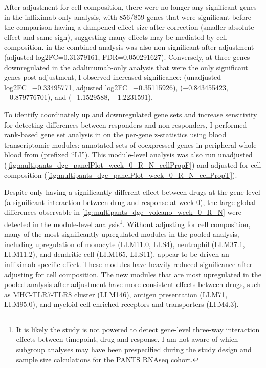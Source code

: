 After adjustment for cell composition, there were no longer any significant genes in the infliximab-only analysis, 
with 856/859 genes that were significant before the comparison having a dampened effect size after correction (smaller absolute effect and same sign), suggesting many effects may be mediated by cell composition.
 in the combined analysis was also non-significant after adjustment (adjusted log2FC=\num{0.31379161}, FDR=\num{0.050291627}).
Conversely, at three genes downregulated in the adalimumab-only analysis that were the only significant genes post-adjustment, I observed increased significance:
 (unadjusted log2FC=\num{-0.33495771}, adjusted log2FC=\num{-0.35115926}), 
 (\num{-0.843455423}, \num{-0.879776701}), 
and  (\num{-1.1529588}, \num{-1.2231591}).

To identify coordinately up and downregulated gene sets and increase sensitivity for detecting differences between responders and non-responders,
I performed rank-based gene set analysis in on the per-gene z-statistics using blood transcriptomic modules: annotated sets of coexpressed genes in peripheral whole blood from \textcite{li2013MolecularSignaturesAntibody} (prefixed \enquote{LI}).
This module-level analysis was also run unadjusted (\cref{fig:multipants_dge_panelPlot_week_0_R_N_cellPropF}) and adjusted for cell composition (\cref{fig:multipants_dge_panelPlot_week_0_R_N_cellPropT}).

Despite only  having a significantly different effect between drugs at the gene-level (a significant interaction between drug and response at week 0), 
the large global differences observable in \cref{fig:multipants_dge_volcano_week_0_R_N} were detected in the module-level analysis\footnote{
It is likely the study is not powered to detect gene-level three-way interaction effects between timepoint, drug and response.
I am not aware of which subgroup analyses may have been prespecified during the study design and sample size calculations for the \gls{PANTS} \gls{RNAseq} cohort.
}.
Without adjusting for cell composition, many of the most significantly upregulated modules in the pooled analysis, 
including upregulation of monocyte (LI.M11.0, LI.S4), neutrophil (LI.M37.1, LI.M11.2), and dendritic cell (LI.M165, LI.S11),
appear to be driven an infliximab-specific effect.
These modules have heavily reduced significance after adjusting for cell composition.
The new modules that are most upregulated in the pooled analysis after adjustment have more consistent effects between drugs, such as
MHC-TLR7-TLR8 cluster (LI.M146), antigen presentation (LI.M71, LI.M95.0), and myeloid cell enriched receptors and transporters (LI.M4.3).

